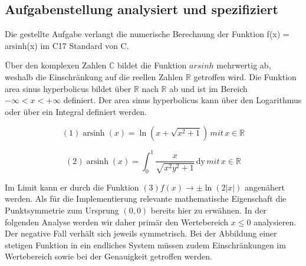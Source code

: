 \documentclass[course=erap] {aspdoc}
\begin{document}
     \subsection{Aufgabenstellung analysiert und spezifiziert}
     Die gestellte Aufgabe verlangt die numerische Berechnung der Funktion f(x) = arsinh(x) im C17 Standard von C.
 
 
     Über den komplexen Zahlen $\mathbb{C}$ bildet die Funktion $arsinh$ mehrwertig ab, weshalb die Einschränkung auf die reellen Zahlen $\mathbb{R}$ getroffen wird.
     Die Funktion area sinus hyperbolicus bildet über $\mathbb{R}$ nach $\mathbb{R}$ ab und ist im Bereich $-\infty < x < + \infty$ definiert.
     Der area sinus hyperbolicus kann über den Logarithmus oder über ein Integral definiert werden.
 
     $$ (1) \operatorname{arsinh}(x) = \ln \left(x + \sqrt{x^2 + 1} \right) \, mit \, x \in \mathbb{R}$$
 
     $$ (2) \operatorname{arsinh}(x) = \int_{0}^{1} \frac{x}{\sqrt{x^2 y^2 + 1}} \,\mathrm{dy} \, mit \, x \in \mathbb{R} $$
 
     Im Limit kann er durch die Funktion $ (3) f(x)\to \pm \ln(2|x|)$ angenähert werden.
     Als für die Implementierung relevante mathematische Eigenschaft die Punktsymmetrie zum Ursprung $(0,0)$ bereits hier zu erwähnen. In der folgenden Analyse werden wir daher primär den Wertebereich $x \leq 0$ analysieren. Der negative Fall verhält sich jeweils symmetrisch.
     Bei der Abbildung einer stetigen Funktion in ein endliches System müssen zudem Einschränkungen im Wertebereich sowie bei der Genauigkeit getroffen werden.
 
\end{document}
